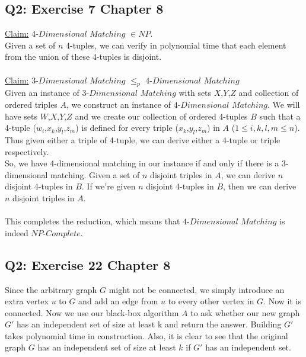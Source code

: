 \documentclass[12pt, oneside]{article}
\begin{document}
\subsection*{Q2: Exercise 7 Chapter 8}
\underline{Claim:} $4$-$Dimensional$ $Matching$ $\in NP$.\\
Given a set of $n$ 4-tuples, we can verify in polynomial time that each element from the union of these 4-tuples is disjoint.\\\\
\underline{Claim:} $3$-$Dimensional$ $Matching$ $\leq_p$ $4$-$Dimensional$ $Matching$\\
Given an instance of $3$-$Dimensional$ $Matching$ with sets $X$,$Y$,$Z$ and collection of ordered triples $A$, we construct an instance of $4$-$Dimensional$ $Matching$. We will have sets $W$,$X$,$Y$,$Z$ and we create our collection of ordered 4-tuples $B$ such that a 4-tuple ($w_i$,$x_k$,$y_l$,$z_m$) is defined for every triple ($x_k$,$y_l$,$z_m$) in $A$ ($1 \leq i,k,l,m \leq n$). Thus given either a triple of 4-tuple, we can derive either a 4-tuple or triple respectively.\\
So, we have 4-dimensional matching in our instance if and only if there is a 3-dimensional matching. Given a set of $n$ disjoint triples in $A$, we can derive $n$ disjoint 4-tuples in $B$. If we're given $n$ disjoint 4-tuples in $B$, then we can derive $n$ disjoint triples in $A$.\\\\
This completes the reduction, which means that $4$-$Dimensional$ $Matching$ is indeed $NP$-$Complete$.\\

\subsection*{Q2: Exercise 22 Chapter 8}
Since the arbitrary graph $G$ might not be connected, we simply introduce an extra vertex $u$ to $G$ and add an edge from $u$ to every other vertex in $G$. Now it is connected. Now we use our black-box algorithm $A$ to ask whether our new graph $G'$ has an independent set of size at least k and return the answer. Building $G'$ takes polynomial time in construction. Also, it is clear to see that the original graph $G$ has an independent set of size at least $k$ if $G'$ has an independent set. 
\end{document}
